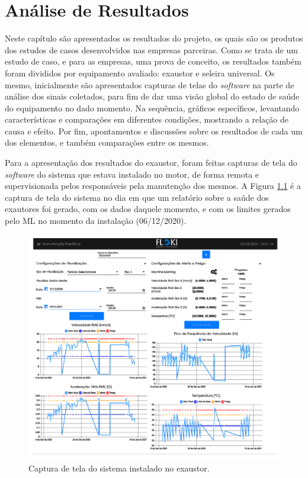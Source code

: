 
\chapter{Análise de Resultados}

Neste capítulo são apresentados os resultados do projeto, os quais são os produtos dos estudos de casos desenvolvidos nas empresas parceiras.
Como se trata de um estudo de caso, e para as empresas, uma prova de conceito, os resultados também foram divididos por equipamento avaliado:
exaustor e seleira universal. Os mesmo, inicialmente são apresentados capturas de telas do \textit{software} na parte de análise dos sinais coletados, para fim
de dar uma visão global do estado de saúde do equipamento no dado momento. Na sequência, gráficos específicos, levantando características e 
comparações em diferentes condições, mostrando a relação de causa e efeito. Por fim, apontamentos e discussões sobre os resultados de cada um
dos elementos, e também comparações entre os mesmos.

Para a apresentação dos resultados do exaustor, foram feitas capturas de tela do \textit{software} do sistema que estava instalado no motor, de forma
remota e supervisionada pelos responsáveis pela manutenção dos mesmos. A Figura \ref{fig:exaustor_1} é a captura de tela do sistema no dia
em que um relatório sobre a saúde dos exautores foi gerado, com os dados daquele momento, e com os limites gerados pelo ML
no momento da instalação (06/12/2020).

\begin{figure}[H]
    \caption{Captura de tela do sistema instalado no exaustor.}
    \begin{center}
        \includegraphics[scale=0.95, page=1]{resultados/img/resultados.pdf}
    \end{center}
    \label{fig:exaustor_1}
\end{figure}

